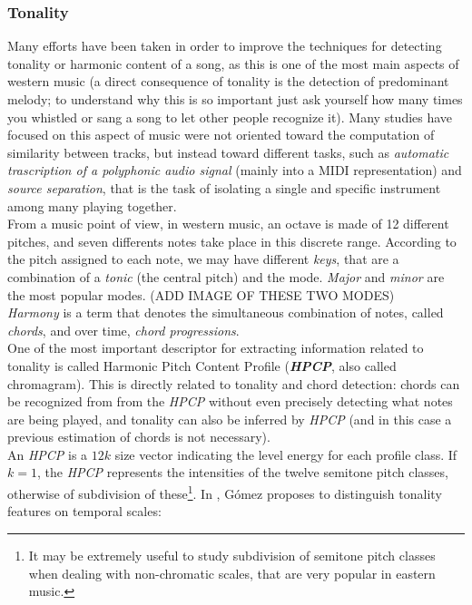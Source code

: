 \subsubsection{Tonality}
Many efforts have been taken in order to improve the techniques for detecting tonality or harmonic content of a song, as this is one of the most main aspects of western music (a direct consequence of tonality is the detection of predominant melody; to understand why this is so important just ask yourself how many times you whistled or sang a song to let other people recognize it). Many studies have focused on this aspect of music were not oriented toward the computation of similarity between tracks, but instead toward different tasks, such as \textit{automatic trascription of a polyphonic audio signal} (mainly into a MIDI representation) and \textit{source separation}, that is the task of isolating a single and specific instrument among many playing together. \\
From a music point of view, in western music, an octave is made of 12 different pitches, and seven differents notes take place in this discrete range. According to the pitch assigned to each note, we may have different \textit{keys}, that are a combination of a \textit{tonic} (the central pitch) and the mode. \textit{Major} and \textit{minor} are the most popular modes. (ADD IMAGE OF THESE TWO MODES) \\
\textit{Harmony} is a term that denotes the simultaneous combination of notes, called \textit{chords}, and over time, \textit{chord progressions}.  \\
One of the most important descriptor for extracting information related to tonality is called Harmonic Pitch Content Profile (\textbf{\textit{HPCP}}, also called chromagram). This is directly related to tonality and chord detection: chords can be recognized from from the \textit{HPCP} without even precisely detecting what notes are being played, and tonality can also be inferred by \textit{HPCP} (and in this case a previous estimation of chords is not necessary). \\
An \textit{HPCP} is a $12k$ size vector indicating the level energy for each profile class. If $k=1$, the \textit{HPCP} represents the intensities of the twelve semitone pitch classes, otherwise of subdivision of these\footnote{It may be extremely useful to study subdivision of semitone pitch classes when dealing with non-chromatic scales, that are very popular in eastern music.}. In \cite{gomez06}, Gómez proposes to distinguish tonality features on temporal scales: 
